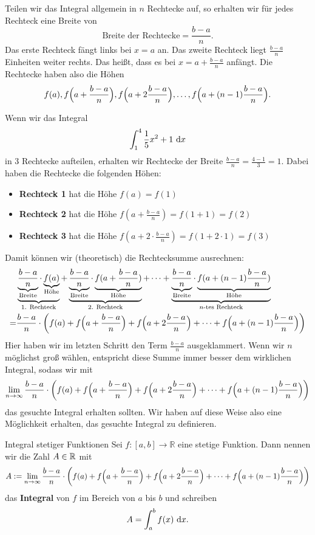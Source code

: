 \documentclass[../../main.tex]{subfiles}
\begin{document}
Teilen wir das Integral allgemein in $n$ Rechtecke auf, so erhalten wir für jedes Rechteck eine Breite von
\[\text{Breite der Rechtecke}=\frac{b-a}{n}.\]
Das erste Rechteck fängt links bei $x=a$ an. Das zweite Rechteck liegt $\frac{b-a}{n}$ Einheiten weiter rechts. Das
heißt, dass es bei $x=a+\frac{b-a}{n}$ anfängt. Die Rechtecke haben also die Höhen
\[f(a), f\Bigl(a+\frac{b-a}{n}\Bigr), f\Bigl(a+2\frac{b-a}{n}\Bigr),\dots,f\Bigl(a+(n-1)\frac{b-a}{n}\Bigr).\]
\begin{example}{}
    Wenn wir das Integral
    \[\int_1^4\frac{1}{5}x^2+1\mathop{}\mathrm{d} x\]
    in 3 Rechtecke aufteilen, erhalten wir Rechtecke der Breite $\frac{b-a}{n}=\frac{4-1}{3}=1$. Dabei haben die
    Rechtecke die folgenden Höhen:
    \begin{itemize}
        \item \textbf{Rechteck 1} hat die Höhe $f(a)=f(1)$
        \item \textbf{Rechteck 2} hat die Höhe $f(a+\frac{b-a}{n})=f(1+1)=f(2)$
        \item \textbf{Rechteck 3} hat die Höhe $f(a+2\cdot\frac{b-a}{n})=f(1+2\cdot 1)=f(3)$
    \end{itemize}
\end{example}

Damit können wir (theoretisch) die Rechtecksumme ausrechnen:
\begin{align*}
    &\underbrace{\underbrace{\frac{b-a}{n}}_{\text{Breite}}\cdot \underbrace{f(a)}_{\text{Höhe}}}_{\text{1. Rechteck}}+\underbrace{\underbrace{\frac{b-a}{n}}_{\text{Breite}}\cdot \underbrace{f(a+\frac{b-a}{n})}_{\text{Höhe}}}_{\text{2. Rechteck}}+\dots+\underbrace{\underbrace{\frac{b-a}{n}}_{\text{Breite}}\cdot \underbrace{f(a+(n-1)\frac{b-a}{n})}_{\text{Höhe}}}_{n\text{-tes Rechteck}}\\
    =&\frac{b-a}{n}\cdot \biggl(f(a)+f\Bigl(a+\frac{b-a}{n}\Bigr)+f\Bigl(a+2\frac{b-a}{n}\Bigr)+\dots+f\Bigl(a+(n-1)\frac{b-a}{n}\Bigr)\biggr)
\end{align*}
Hier haben wir im letzten Schritt den Term $\frac{b-a}{n}$ ausgeklammert. Wenn wir $n$ möglichst groß wählen, entspricht diese Summe immer 
besser dem wirklichen Integral, sodass wir mit
\[\lim_{n\rightarrow\infty}\frac{b-a}{n}\cdot \biggl(f(a)+f\Bigl(a+\frac{b-a}{n}\Bigr)+f\Bigl(a+2\frac{b-a}{n}\Bigr)+\dots+f\Bigl(a+(n-1)\frac{b-a}{n}\Bigr)\biggr)\]
das gesuchte Integral erhalten sollten. Wir haben auf diese Weise also eine Möglichkeit erhalten, das gesuchte Integral
zu definieren.

\begin{definition}{Integral stetiger Funktionen}
    Sei $f:[a,b]\rightarrow\mathbb{R}$ eine stetige Funktion. Dann nennen wir die Zahl $A\in\mathbb{R}$ mit
    \[A:=\lim_{n\rightarrow\infty}\frac{b-a}{n}\cdot \biggl(f(a)+f\Bigl(a+\frac{b-a}{n}\Bigr)+f\Bigl(a+2\frac{b-a}{n}\Bigr)+\dots+f\Bigl(a+(n-1)\frac{b-a}{n}\Bigr)\biggr)\]
    das \textbf{Integral} von $f$ im Bereich von $a$ bis $b$ und schreiben
    \[A=\int_a^bf(x)\mathop{}\mathrm{d} x.\]
\end{definition}
\end{document}
